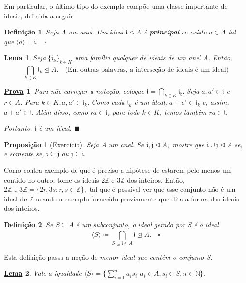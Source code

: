 \documentclass{article}
\newtheorem*{def*}{\underline{Defini\c c\~ao}}
\newtheorem*{lemma*}{\underline{Lema}}
\newtheorem*{prop*}{\underline{Proposi\c c\~ao}}
\newtheorem*{proof*}{\underline{Prova}}
\renewcommand\qedsymbol{$\blacksquare$}
\begin{document}
Em particular, o último tipo do exemplo compõe uma classe importante de ideais, definida a seguir
\begin{def*}
  Seja A um anel. Um ideal \(\mathfrak{i}\trianglelefteq{A}\) é \textbf{principal} se existe \(a\in A\) tal que \(\langle a \rangle = \mathfrak{i}.\quad\square\)
\end{def*}
\begin{lemma*}
  Seja \(\{\mathfrak{i}_{k}\}_{k\in K}\) uma família qualquer de ideais de um anel A. Então, 
  \[
    \bigcap_{k\in K}^{}{\mathfrak{i}_{k}}\trianglelefteq{A}.\quad \text{(Em outras palavras, a interseção de ideais é um ideal)}
  \]
\end{lemma*}
\begin{proof*}
  Para não carregar a notação, coloque \(\mathfrak{i} = \bigcap_{k\in K}^{}{\mathfrak{i_{k}}}.\) Seja \(a, a'\in \mathfrak{i}\) e \(r\in A\).
  Para \(k\in K, a, a'\in \mathfrak{i}_{k}\). Como cada \(\mathfrak{i}_{k}\) é um ideal, \(a + a'\in \mathfrak{i}_{k}\) e, assim,
  \(a + a'\in \mathfrak{i}.\) Além disso, como \(ra\in \mathfrak{i}_{k}\) para todo \(k\in K\), temos também \(ra \in \mathfrak{i}.\)

  Portanto, \(\mathfrak{i}\) é um ideal. \qedsymbol
\end{proof*}
\begin{prop*}[Exercício]
  Seja A um anel. Se \(\mathfrak{i}, \mathfrak{j}\trianglelefteq{A},\) mostre que \(\mathfrak{i}\cup \mathfrak{j}\trianglelefteq{A}\) se, e somente se,
  \(\mathfrak{i}\subseteq{\mathfrak{j}}\) ou \(\mathfrak{j}\subseteq{\mathfrak{i}}.\)
\end{prop*}
Como contra exemplo de que é preciso a hipótese de estarem pelo menos um contido no outro, tome os ideais \(2 \mathbb{Z}\) e \(3 \mathbb{Z}\) dos inteiros.
Então, \(2\mathbb{Z}\cup 3 \mathbb{Z} = \{2r, 3s: r, s \in \mathbb{Z}\},\) tal que é possível ver que esse conjunto não é um ideal de \(\mathbb{Z}\) usando o exemplo
fornecido previamente que dita a forma dos ideais dos inteiros.
\begin{def*}
  Se \(S\subseteq{A}\) é um subconjunto, o ideal gerado por S é o ideal 
  \[
    \langle S \rangle\coloneqq \bigcap_{S\subseteq{\mathfrak{i}}\trianglelefteq{A}}^{}{\mathfrak{i}} \trianglelefteq{A}.\quad\square
  \]
\end{def*}
Esta definição passa a noção de \textit{menor ideal que contém o conjunto S.}
\begin{lemma*}
  Vale a igualdade \(\langle S \rangle = \{\sum\limits_{i=1}^{n}a_{i}s_{i}: a_{i}\in A, s_{i}\in S, n\in \mathbb{N}\}.\)
\end{lemma*}
\end{document}
